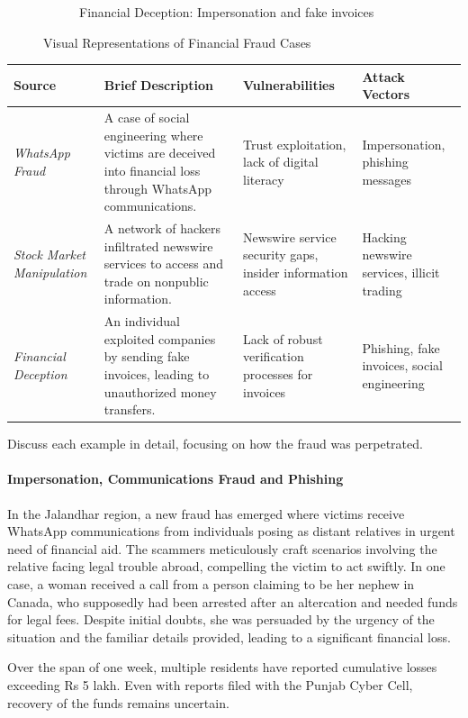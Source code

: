 \documentclass[11pt]{article}
\begin{document}
\begin{figure}[ht]
\begin{subfigure}{.3\textwidth}
      \caption{Financial Deception: Impersonation and fake invoices}
      \label{fig:sub3}
    \end{subfigure}
    \caption{Visual Representations of Financial Fraud Cases}
    \label{fig:test}
    \end{figure}

\begin{tabular}{@{}p{2cm}p{3cm}p{3cm}p{3cm}@{}}
\toprule
\textbf{Source} & \textbf{Brief Description} & \textbf{Vulnerabilities} & \textbf{Attack Vectors} \\ \midrule
\textit{WhatsApp Fraud} & A case of social engineering where victims are deceived into financial loss through WhatsApp communications. & Trust exploitation, lack of digital literacy & Impersonation, phishing messages \\
\textit{Stock Market Manipulation} & A network of hackers infiltrated newswire services to access and trade on nonpublic information. & Newswire service security gaps, insider information access & Hacking newswire services, illicit trading \\

\textit{Financial Deception} & An individual exploited companies by sending fake invoices, leading to unauthorized money transfers. & Lack of robust verification processes for invoices & Phishing, fake invoices, social engineering \\
\bottomrule
\end{tabular}

Discuss each example in detail, focusing on how the fraud was perpetrated.
\paragraph*{Impersonation, Communications Fraud and Phishing}
In the Jalandhar region, a new fraud has emerged where victims receive WhatsApp communications from individuals posing as distant relatives in urgent need of financial aid. The scammers meticulously craft scenarios involving the relative facing legal trouble abroad, compelling the victim to act swiftly. In one case, a woman received a call from a person claiming to be her nephew in Canada, who supposedly had been arrested after an altercation and needed funds for legal fees. Despite initial doubts, she was persuaded by the urgency of the situation and the familiar details provided, leading to a significant financial loss.

Over the span of one week, multiple residents have reported cumulative losses exceeding Rs 5 lakh. Even with reports filed with the Punjab Cyber Cell, recovery of the funds remains uncertain.
\end{document}
